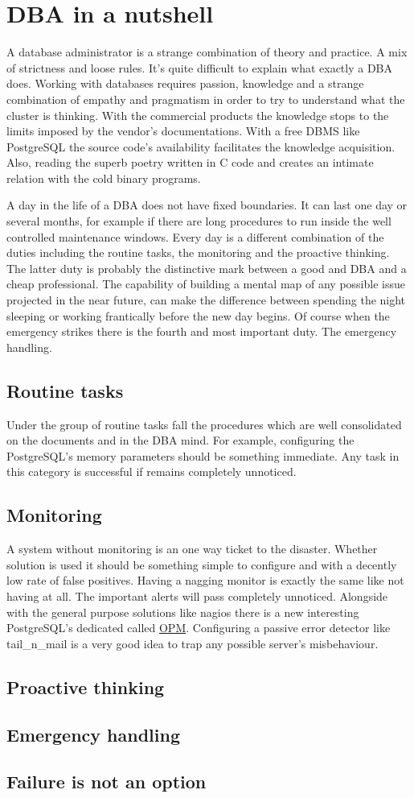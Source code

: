 \chapter{DBA in a nutshell}
A database administrator is a strange combination of theory and practice. A mix of strictness and loose 
rules. It's quite difficult to explain what exactly a DBA does. Working with databases requires passion, 
knowledge and a strange combination of empathy and pragmatism in order to try to understand what the 
cluster is thinking. With the commercial products the knowledge stops to the limits imposed by the vendor's 
documentations. With a free DBMS like PostgreSQL the source code's availability facilitates the knowledge 
acquisition. Also, reading the superb poetry written in C code and creates an intimate relation with the 
cold binary programs.\newline

A day in the life of a DBA does not have fixed boundaries. It can last one day or several months, for 
example if there are long procedures to run inside the well controlled maintenance windows. Every day 
is a different combination of the duties including the routine tasks, the monitoring and the proactive 
thinking. The latter duty is probably the distinctive mark between a good and DBA and a cheap professional. 
The capability of building a mental map of any possible issue projected in the near future, can make the 
difference between spending the night sleeping or working frantically before the new day begins. Of course 
when the emergency strikes there is the fourth and most important duty. The emergency handling. 

\section{Routine tasks}
Under the group of routine tasks fall the procedures which are well consolidated on the documents and in 
the DBA mind. For example, configuring the PostgreSQL's memory parameters should be something immediate. 
Any task in this category is successful if remains completely unnoticed.

\section{Monitoring}
A system without monitoring is an one way ticket to the disaster. Whether solution is used it should be 
something simple to configure and with a decently low rate of false positives. Having a nagging monitor is 
exactly the same like not having at all. The important alerts will pass completely unnoticed. Alongside 
with the general purpose solutions like nagios there is a new interesting PostgreSQL's dedicated called 
\href{http://opm.io/}{OPM}. Configuring a passive error detector like tail\_n\_mail is a very good idea to 
trap any possible server's misbehaviour. 

\section{Proactive thinking}

\section{Emergency handling}

\section{Failure is not an option}